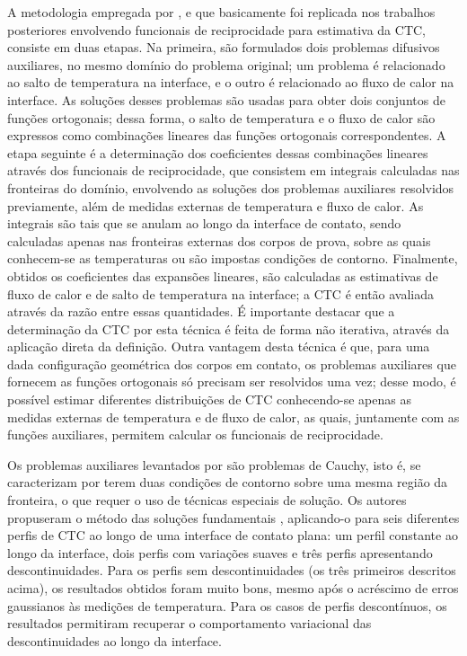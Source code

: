 A metodologia empregada por \cite{reciproc_3}, e que basicamente foi replicada nos trabalhos posteriores envolvendo funcionais de reciprocidade para estimativa
da CTC, consiste em duas etapas. Na primeira,
são formulados dois problemas difusivos auxiliares, no mesmo domínio do problema original; um problema é relacionado ao salto de temperatura na interface, e
o outro é relacionado ao fluxo de calor na interface. As soluções desses problemas são usadas para obter dois conjuntos de funções ortogonais; dessa forma,
o salto de temperatura e o fluxo de calor são expressos como combinações lineares das funções ortogonais correspondentes. A etapa seguinte é a determinação 
dos coeficientes dessas combinações lineares através dos funcionais de reciprocidade, que consistem em integrais calculadas nas fronteiras do domínio, envolvendo as soluções dos
problemas auxiliares resolvidos previamente, além de medidas externas de temperatura e fluxo de calor. As integrais são tais que
se anulam ao longo da interface de contato, sendo calculadas apenas nas fronteiras externas dos corpos de prova, sobre as quais conhecem-se as temperaturas
ou são impostas condições de contorno. Finalmente, obtidos os coeficientes das expansões lineares, são calculadas as estimativas de fluxo de calor e de salto de temperatura na interface;
a CTC é então avaliada através da razão entre essas quantidades. É importante destacar que a determinação da CTC por esta técnica é feita de forma não iterativa,
através da aplicação direta da definição. Outra vantagem desta técnica é que, para uma dada configuração geométrica dos corpos em contato, os problemas auxiliares que
fornecem as funções ortogonais só precisam ser resolvidos uma vez; desse modo, é possível estimar diferentes distribuições de CTC conhecendo-se apenas as medidas externas de temperatura
e de fluxo de calor, as quais, juntamente com as funções auxiliares, permitem calcular os funcionais de reciprocidade.

Os problemas auxiliares levantados por \cite{reciproc_3} são problemas de Cauchy, isto é, se caracterizam por terem duas condições de contorno sobre uma
mesma região da fronteira, o que requer o uso de técnicas especiais de solução. Os autores propuseram o método das soluções fundamentais \citep{artigo_marin}, aplicando-o
para seis diferentes perfis de CTC ao longo de uma interface de contato plana: um perfil constante ao longo da interface, dois perfis com variações suaves e três perfis apresentando descontinuidades. Para os
perfis sem descontinuidades (os três primeiros descritos acima), os resultados obtidos foram muito bons, mesmo após o acréscimo de erros gaussianos às medições
de temperatura. Para os casos de perfis descontínuos, os resultados permitiram recuperar o comportamento variacional das descontinuidades ao longo da interface.

